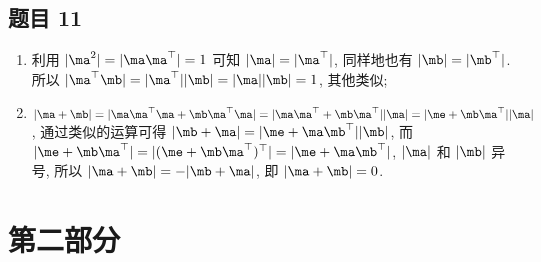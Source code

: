 \subsection*{ 题目 11 }
\begin{solution}
\begin{enumerate}
    \item 利用 $|\ma^2| = |\ma\ma^\top| = 1$ 可知 $|\ma| = |\ma^\top|$, 同样地也有 $|\mb| = |\mb^\top|$. 所以 $|\ma^\top \mb| = |\ma^\top||\mb| = |\ma||\mb| = 1$, 其他类似;
    \item $|\ma + \mb| = |\ma\ma^\top\ma + \mb\ma^\top\ma| = |\ma\ma^\top+ \mb\ma^\top||\ma| = |\me + \mb\ma^\top||\ma|$, 通过类似的运算可得 $|\mb + \ma| = |\me + \ma\mb^\top||\mb|$, 而 $|\me + \mb\ma^\top| = |(\me + \mb\ma^\top)^\top| = |\me + \ma\mb^\top|$, $|\ma|$ 和 $|\mb|$ 异号, 所以 $|\ma + \mb| = -|\mb + \ma|$, 即 $|\ma + \mb| = 0$.
\end{enumerate}
\end{solution}

\newpage
\section{第二部分}

